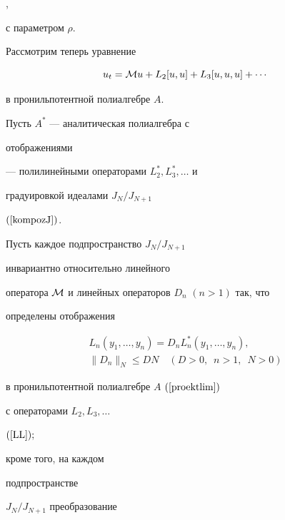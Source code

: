\cite{8}, \cite{9}


с параметром $\rho$.





Рассмотрим теперь уравнение


\begin{equation}


\label{diffuravnenie}


u_t={\cal{M}}u+L_2[u,u]+L_3[u,u,u]+\dotsb


\end{equation}


в пронильпотентной полиалгебре $A$.





\begin{thm}


\label{Teorema1}


Пусть $A^*$ --- аналитическая полиалгебра с


отображениями


--- полилинейными операторами $L^*_2, L^*_3, \dotsc$ и


градуировкой идеалами $J_N/J_{N+1}$


$(\ref{kompozJ})$.


Пусть каждое подпространство $J_N/J_{N+1}$


инвариантно относительно линейного


оператора ${\cal{M}}$ и линейных операторов $D_n$ $(n>1)$ так, что


определены отображения


\begin{gather}


\label{LL}


L_n(y_1,\dotsc,y_n)=D_nL_n^*(y_1,\dotsc,y_n), \\


%


\label{normaD}


\|D_n\|_{N}\leq DN \quad (D>0,\ \; n>1, \ \; N>0)


\end{gather}


в пронильпотентной полиалгебре $A$ $(\ref{proektlim})$


с операторами $L_2,L_3,\dotsc$


$(\ref{LL});$


кроме того, на каждом


подпространстве


 $J_N/J_{N+1}$ преобразование



\end{thm}

